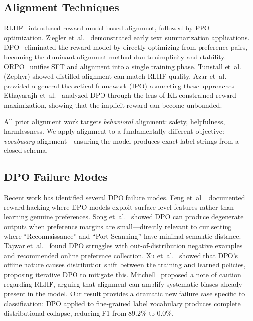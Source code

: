 \documentclass[journal]{IEEEtran}
\begin{document}
\subsection{Alignment Techniques}
RLHF~\cite{ouyang2022} introduced reward-model-based alignment, followed by PPO optimization. Ziegler et~al.~\cite{ziegler2019} demonstrated early text summarization applications. DPO~\cite{rafailov2023} eliminated the reward model by directly optimizing from preference pairs, becoming the dominant alignment method due to simplicity and stability. ORPO~\cite{hong2024} unifies SFT and alignment into a single training phase. Tunstall et~al.~\cite{tunstall2023} (Zephyr) showed distilled alignment can match RLHF quality. Azar et~al.~\cite{azar2024} provided a general theoretical framework (IPO) connecting these approaches. Ethayarajh et~al.~\cite{ethayarajh2024} analyzed DPO through the lens of KL-constrained reward maximization, showing that the implicit reward can become unbounded.

All prior alignment work targets \emph{behavioral} alignment: safety, helpfulness, harmlessness. We apply alignment to a fundamentally different objective: \emph{vocabulary} alignment---ensuring the model produces exact label strings from a closed schema.

\subsection{DPO Failure Modes}
Recent work has identified several DPO failure modes. Feng et~al.~\cite{feng2024} documented reward hacking where DPO models exploit surface-level features rather than learning genuine preferences. Song et~al.~\cite{song2024} showed DPO can produce degenerate outputs when preference margins are small---directly relevant to our setting where ``Reconnaissance'' and ``Port Scanning'' have minimal semantic distance. Tajwar et~al.~\cite{tajwar2024} found DPO struggles with out-of-distribution negative examples and recommended online preference collection. Xu et~al.~\cite{xu2024} showed that DPO's offline nature causes distribution shift between the training and learned policies, proposing iterative DPO to mitigate this. Mitchell~\cite{mitchell2023} proposed a note of caution regarding RLHF, arguing that alignment can amplify systematic biases already present in the model. Our result provides a dramatic new failure case specific to classification: DPO applied to fine-grained label vocabulary produces complete distributional collapse, reducing F1 from 89.2\% to 0.0\%.
\end{document}
